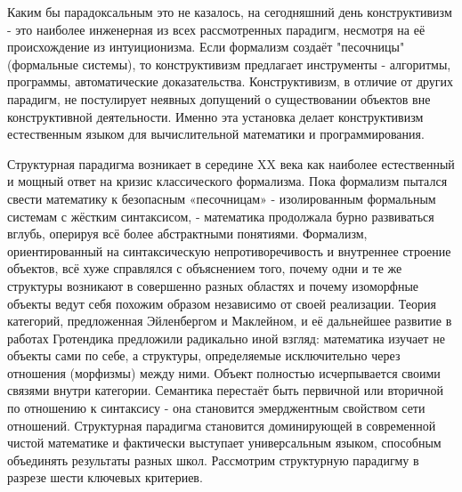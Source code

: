 \documentclass[12pt]{article}
\begin{document}
Каким бы парадоксальным это не казалось, на сегодняшний день конструктивизм - это наиболее инженерная из всех рассмотренных парадигм, несмотря на её происхождение из интуиционизма. Если формализм создаёт "песочницы" (формальные системы), то конструктивизм предлагает инструменты - алгоритмы, программы, автоматические доказательства. Конструктивизм, в отличие от других парадигм, не постулирует неявных допущений о существовании объектов вне конструктивной деятельности. Именно эта установка делает конструктивизм естественным языком для вычислительной математики и программирования.

Структурная парадигма возникает в середине XX века как наиболее естественный и мощный ответ на кризис классического формализма. Пока формализм пытался свести математику к безопасным «песочницам» - изолированным формальным системам с жёстким синтаксисом, - математика продолжала бурно развиваться вглубь, оперируя всё более абстрактными понятиями. Формализм, ориентированный на синтаксическую непротиворечивость и внутреннее строение объектов, всё хуже справлялся с объяснением того, почему одни и те же структуры возникают в совершенно разных областях и почему изоморфные объекты ведут себя похожим образом независимо от своей реализации. Теория категорий, предложенная Эйленбергом и Маклейном, и её дальнейшее развитие в работах Гротендика предложили радикально иной взгляд: математика изучает не объекты сами по себе, а структуры, определяемые исключительно через отношения (морфизмы) между ними. Объект полностью исчерпывается своими связями внутри категории. Семантика перестаёт быть первичной или вторичной по отношению к синтаксису - она становится эмерджентным свойством сети отношений. Структурная парадигма становится доминирующей в современной чистой математике и фактически выступает универсальным языком, способным объединять результаты разных школ. Рассмотрим структурную парадигму в разрезе шести ключевых критериев.
\end{document}
